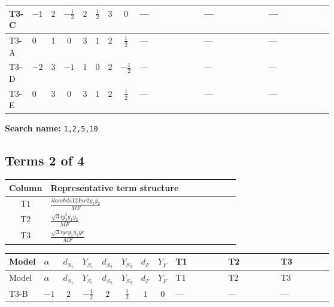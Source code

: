 \documentclass[8pt]{article}
\begin{document}
\begin{landscape}
\begin{longtable}{@{}llcccccc >{\raggedright\arraybackslash}p{0.21\linewidth} >{\raggedright\arraybackslash}p{0.21\linewidth} >{\raggedright\arraybackslash}p{0.21\linewidth}@{}}
\midrule
T3-C & $-1$ & $2$ & $-\frac{1}{2}$ & $2$ & $\frac{1}{2}$ & $3$ & $0$ & --- & --- & --- \\
\midrule
T3-A & $0$ & $1$ & $0$ & $3$ & $1$ & $2$ & $\frac{1}{2}$ & --- & --- & --- \\
\midrule
T3-D & $-2$ & $3$ & $-1$ & $1$ & $0$ & $2$ & $-\frac{1}{2}$ & --- & --- & --- \\
\midrule
T3-E & $0$ & $3$ & $0$ & $3$ & $1$ & $2$ & $\frac{1}{2}$ & --- & --- & --- \\
\midrule
\bottomrule
\end{longtable}
\clearpage
\noindent\textbf{Search name: }\texttt{1,2,5,10}\par\smallskip
\subsection*{Terms 2 of 4}
\begin{center}
\begin{tabular}{@{}c >{\raggedright\arraybackslash}p{0.82\linewidth}@{}}
\toprule
Column & Representative term structure \\
\midrule
T1 & \(\displaystyle \frac{i lambda12Inv2 \overline{y_{1}} \overline{y_{2}}}{MF}\) \\
\midrule
T2 & \(\displaystyle \frac{\sqrt{3} i g_{2}^{2} \overline{y_{1}} \overline{y_{2}}}{MF}\) \\
\midrule
T3 & \(\displaystyle \frac{\sqrt{3} i ye \overline{y_{1}} \overline{y_{2}} \overline{ye}}{MF}\) \\
\midrule
\bottomrule
\end{tabular}
\end{center}
\smallskip
\tiny
\begin{longtable}{@{}llcccccc >{\raggedright\arraybackslash}p{0.21\linewidth} >{\raggedright\arraybackslash}p{0.21\linewidth} >{\raggedright\arraybackslash}p{0.21\linewidth}@{}}
\toprule
Model & $\alpha$ & $d_{S_1}$ & $Y_{S_1}$ & $d_{S_2}$ & $Y_{S_2}$ & $d_F$ & $Y_F$ & T1 & T2 & T3 \\
\midrule
\endfirsthead
\toprule
Model & $\alpha$ & $d_{S_1}$ & $Y_{S_1}$ & $d_{S_2}$ & $Y_{S_2}$ & $d_F$ & $Y_F$ & T1 & T2 & T3 \\
\midrule
\endhead
T3-B & $-1$ & $2$ & $-\frac{1}{2}$ & $2$ & $\frac{1}{2}$ & $1$ & $0$ & --- & --- & --- \\
\midrule

\end{longtable}
\end{landscape}
\end{document}
